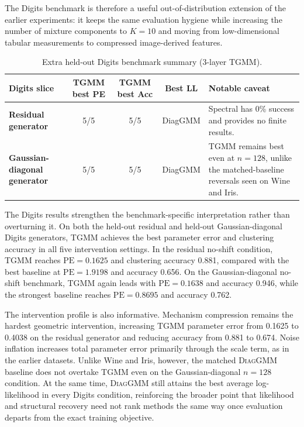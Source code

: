 \documentclass{article}
\newcommand{\tgmm}{\textsc{TGMM}}
\newcommand{\diaggmm}{\textsc{DiagGMM}}
\newcommand{\PE}{\mathrm{PE}}
\begin{document}
The Digits benchmark is therefore a useful out-of-distribution extension of the earlier experiments: it keeps the same evaluation hygiene while increasing the number of mixture components to $K=10$ and moving from low-dimensional tabular measurements to compressed image-derived features.

\begin{table}[t]
\centering
\small
\caption{Extra held-out Digits benchmark summary (3-layer TGMM).}
\label{tab:digits-summary}
\begin{tabularx}{\linewidth}{>{\bfseries}l c c c X}
\toprule
Digits slice & TGMM best PE & TGMM best Acc & Best LL & Notable caveat \\
\midrule
Residual generator & 5/5 & 5/5 & DiagGMM & Spectral has 0\% success and provides no finite results. \\
Gaussian-diagonal generator & 5/5 & 5/5 & DiagGMM & TGMM remains best even at $n=128$, unlike the matched-baseline reversals seen on Wine and Iris. \\
\bottomrule
\end{tabularx}
\end{table}

The Digits results strengthen the benchmark-specific interpretation rather than overturning it. On both the held-out residual and held-out Gaussian-diagonal Digits generators, \tgmm{} achieves the best parameter error and clustering accuracy in all five intervention settings. In the residual no-shift condition, \tgmm{} reaches $\PE=0.1625$ and clustering accuracy 0.881, compared with the best baseline at $\PE=1.9198$ and accuracy 0.656. On the Gaussian-diagonal no-shift benchmark, \tgmm{} again leads with $\PE=0.1638$ and accuracy 0.946, while the strongest baseline reaches $\PE=0.8695$ and accuracy 0.762.

The intervention profile is also informative. Mechanism compression remains the hardest geometric intervention, increasing \tgmm{} parameter error from 0.1625 to 0.4038 on the residual generator and reducing accuracy from 0.881 to 0.674. Noise inflation increases total parameter error primarily through the scale term, as in the earlier datasets. Unlike Wine and Iris, however, the matched \diaggmm{} baseline does not overtake \tgmm{} even on the Gaussian-diagonal $n=128$ condition. At the same time, \diaggmm{} still attains the best average log-likelihood in every Digits condition, reinforcing the broader point that likelihood and structural recovery need not rank methods the same way once evaluation departs from the exact training objective.
\end{document}
